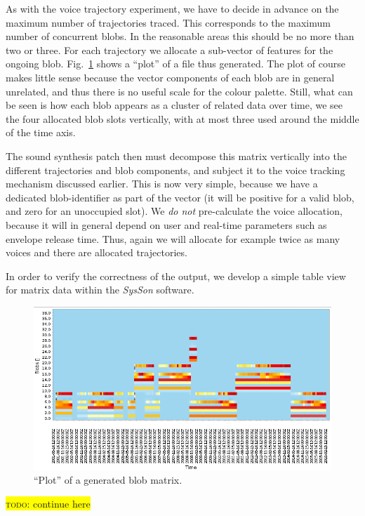 \documentclass[11pt,a4paper]{article}
\newcommand{\todo}[1]{\colorbox{yellow}{\textsc{todo}: #1}}
\newcommand{\figref}[1]{Fig.~\ref{#1}}
\newcommand{\software}[1]{\textit{#1}}
\begin{document}
As with the voice trajectory experiment, we have to decide in advance on the maximum number of trajectories traced. This corresponds to the maximum number of concurrent blobs. In the reasonable areas this should be no more than two or three. For each trajectory we allocate a sub-vector of features for the ongoing blob. \figref{fig:qbo-blobs-matrix-out} shows a ``plot'' of a file thus generated. The plot of course makes little sense because the vector components of each blob are in general unrelated, and thus there is no useful scale for the colour palette. Still, what can be seen is how each blob appears as a cluster of related data over time, we see the four allocated blob slots vertically, with at most three used around the middle of the time axis.

The sound synthesis patch then must decompose this matrix vertically into the different trajectories and blob components, and subject it to the voice tracking mechanism discussed earlier. This is now very simple, because we have a dedicated blob-identifier as part of the vector (it will be positive for a valid blob, and zero for an unoccupied slot). We \emph{do not} pre-calculate the voice allocation, because it will in general depend on user and real-time parameters such as envelope release time. Thus, again we will allocate for example twice as many voices and there are allocated trajectories.

In order to verify the correctness of the output, we develop a simple table view for matrix data within the \software{SysSon} software.

\begin{figure}
\includegraphics[width=\textwidth]{figures/qbo-blobs-matrix-out.png}
\caption{``Plot'' of a generated blob matrix.}
\label{fig:qbo-blobs-matrix-out}
\end{figure}
%

\todo{continue here}

\end{document}
